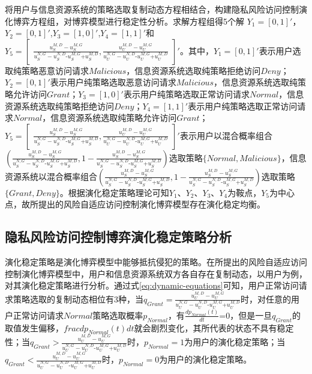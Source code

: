 将用户与信息资源系统的策略选取复制动态方程相结合，构建隐私风险访问控制演化博弈方程组，对博弈模型进行稳定性分析。求解方程组得5个解 ${{Y}_{1}}=[0,1]'$，${{Y}_{2}}=\left[ 0 ,1 \right]'$,${{Y}_{3}}=\left[1 ,0 \right]'$,${{Y}_{4}}=\left[ 1 ,1 \right]'$和${{Y}_{5}}=
\begin{bmatrix}
\frac{u_{S}^{M,D}-u_{S}^{M,G}}{u_{S}^{N,G}-u_{S}^{N,D}\text{-}u_{S}^{M,G}\text{+}u_{S}^{M,D}},
\frac{u_{U}^{M,D}-u_{U}^{M,G}}{u_{U}^{N,G}-u_{U}^{N,D}\text{-}u_{U}^{M,G}\text{+}u_{U}^{M,D}}
\end{bmatrix}'$。其中，${{Y}_{1}}=[0,1]'$表示用户选取纯策略恶意访问请求$Malicious$，信息资源系统选取纯策略拒绝访问$Deny$；${{Y}_{2}}=\left[ 0 ,1 \right]'$表示用户纯策略选取恶意访问请求$Malicious$，信息资源系统选取纯策略允许访问$Grant$；${{Y}_{3}}=\left[1 ,0 \right]'$表示用户纯策略选取正常访问请求$Normal$，信息资源系统选取纯策略拒绝访问$Deny$；${{Y}_{4}}=\left[ 1 ,1 \right]'$表示用户纯策略选取正常访问请求$Normal$，信息资源系统选取纯策略允许访问$Grant$；${{Y}_{5}}=
\begin{bmatrix}
\frac{u_{S}^{M,D}-u_{S}^{M,G}}{u_{S}^{N,G}-u_{S}^{N,D}\text{-}u_{S}^{M,G}\text{+}u_{S}^{M,D}},
\frac{u_{U}^{M,D}-u_{U}^{M,G}}{u_{U}^{N,G}-u_{U}^{N,D}\text{-}u_{U}^{M,G}\text{+}u_{U}^{M,D}}
\end{bmatrix}'$表示用户以混合概率组合$( \frac{u_{S}^{M,D}-u_{S}^{M,G}}{u_{S}^{N,G}-u_{S}^{N,D}\text{-}u_{S}^{M,G}\text{+}u_{S}^{M,D}}, 1- \frac{u_{S}^{M,D}-u_{S}^{M,G}}{u_{S}^{N,G}-u_{S}^{N,D}\text{-}u_{S}^{M,G}\text{+}u_{S}^{M,D}})$选取策略$\{Normal, Malicious\}$，信息资源系统以混合概率组合$(\frac{u_{S}^{M,D}-u_{S}^{M,G}}{u_{S}^{N,G}-u_{S}^{N,D}\text{-}u_{S}^{M,G}\text{+}u_{S}^{M,D}} , 1-\frac{u_{S}^{M,D}-u_{S}^{M,G}}{u_{S}^{N,G}-u_{S}^{N,D}\text{-}u_{S}^{M,G}\text{+}u_{S}^{M,D}} )$选取策略$\{Grant, Deny\}$。根据演化稳定策略理论可知$Y_1$、$Y_2$、$Y_3$、$Y_4$为鞍点，$Y_5$为中心点，故所提出的风险自适应访问控制演化博弈模型存在演化稳定均衡。

\subsection{隐私风险访问控制博弈演化稳定策略分析}
演化稳定策略是演化博弈模型中能够抵抗侵犯的策略。在所提出的风险自适应访问控制演化博弈模型中，用户和信息资源系统双方各自存在复制动态，以用户为例，对其演化稳定策略进行分析。通过式\ref{eq:dynamic-equations}可知，用户正常访问请求策略选取的复制动态相位有3种，当${{q}_{Grant}}=\frac{u_{U}^{M,D}-u_{U}^{M,G}}{u_{U}^{N,G}-u_{U}^{N,D}\text{-}u_{U}^{M,G}\text{+}u_{U}^{M,D}}$时，对任意的用户正常访问请求$Normal$策略选取概率$p_{Normal}$，有$\frac{d{{p}_{Normal}}(t)}{dt}\text{=0}$，但是一旦$q_{Grant}$的取值发生偏移，$frac{d{{p}_{Normal}}(t)}{dt}$就会剧烈变化，其所代表的状态不具有稳定性；当${{q}_{Grant}}>\frac{u_{U}^{M,D}-u_{U}^{M,G}}{u_{U}^{N,G}-u_{U}^{N,D}\text{-}u_{U}^{M,G}\text{+}u_{U}^{M,D}}$时，$p_{Normal}= 1$为用户的演化稳定策略；当${{q}_{Grant}}<\frac{u_{U}^{M,D}-u_{U}^{M,G}}{u_{U}^{N,G}-u_{U}^{N,D}\text{-}u_{U}^{M,G}\text{+}u_{U}^{M,D}}$时，$p_{Normal}=0$为用户的演化稳定策略。

